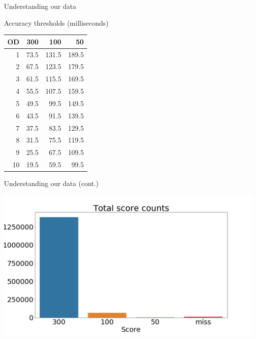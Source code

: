 \documentclass[table]{beamer}
\begin{document}
\begin{frame}[label=od-table]{Understanding our data}
  \begin{block}{Accuracy thresholds (milliseconds)}
    \begin{center}
      \begin{tabular}{r | r r r}
        OD & 300 & 100 & 50 \\
        \hline
        1 & 73.5 & 131.5 & 189.5 \\
        2 & 67.5 & 123.5 & 179.5 \\
        3 & 61.5 & 115.5 & 169.5 \\
        4 & 55.5 & 107.5 & 159.5 \\
        5 & 49.5 & 99.5 & 149.5 \\
        6 & 43.5 & 91.5 & 139.5 \\
        7 & 37.5 & 83.5 & 129.5 \\
        8 & 31.5 & 75.5 & 119.5 \\
        9 & 25.5 & 67.5 & 109.5 \\
        10 & 19.5 & 59.5 & 99.5
      \end{tabular}
    \end{center}
  \end{block}
\end{frame}

\begin{frame}{Understanding our data (cont.)}
  \begin{center}
    \includegraphics[width=1.00\textwidth]{images/hit-counts.png}
  \end{center}
\end{frame}
\end{document}
